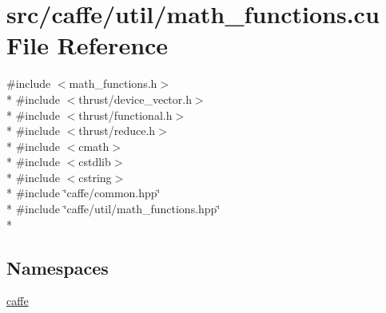 \hypertarget{math__functions_8cu}{\section{src/caffe/util/math\+\_\+functions.cu File Reference}
\label{math__functions_8cu}
}
{\ttfamily \#include $<$math\+\_\+functions.\+h$>$}\\*
{\ttfamily \#include $<$thrust/device\+\_\+vector.\+h$>$}\\*
{\ttfamily \#include $<$thrust/functional.\+h$>$}\\*
{\ttfamily \#include $<$thrust/reduce.\+h$>$}\\*
{\ttfamily \#include $<$cmath$>$}\\*
{\ttfamily \#include $<$cstdlib$>$}\\*
{\ttfamily \#include $<$cstring$>$}\\*
{\ttfamily \#include \char`\"{}caffe/common.\+hpp\char`\"{}}\\*
{\ttfamily \#include \char`\"{}caffe/util/math\+\_\+functions.\+hpp\char`\"{}}\\*
\subsection*{Namespaces}
\begin{DoxyCompactItemize}
\item 
 \hyperlink{namespacecaffe}{caffe}
\end{DoxyCompactItemize}
